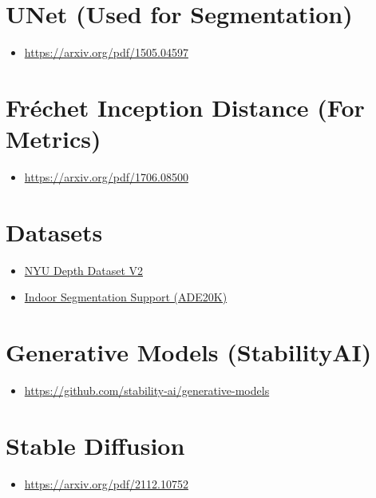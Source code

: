 \documentclass[12pt,a4paper]{report}
\begin{document}
\section*{UNet (Used for Segmentation)}
\begin{itemize}
    \item \href{https://arxiv.org/pdf/1505.04597}{https://arxiv.org/pdf/1505.04597}
\end{itemize}

\section*{Fréchet Inception Distance (For Metrics)}
\begin{itemize}
    \item \href{https://arxiv.org/pdf/1706.08500}{https://arxiv.org/pdf/1706.08500}
\end{itemize}

\section*{Datasets}
\begin{itemize}
    \item \href{https://cs.nyu.edu/~fergus/datasets/nyu_depth_v2.html}{NYU Depth Dataset V2}
    \item \href{https://cs.nyu.edu/~fergus/datasets/indoor_seg_support.pdf}{Indoor Segmentation Support (ADE20K)}
\end{itemize}

\section*{Generative Models (StabilityAI)}
\begin{itemize}
    \item \href{https://github.com/stability-ai/generative-models}{https://github.com/stability-ai/generative-models}
\end{itemize}

\section*{Stable Diffusion}
\begin{itemize}
    \item \href{https://arxiv.org/pdf/2112.10752}{https://arxiv.org/pdf/2112.10752}
\end{itemize}
\end{document}
